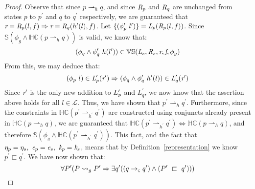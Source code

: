 \begin{proof}
Observe that since $p \rightharpoonup_{h} q$, and since $\emph{R}_{p}$ and $\emph{R}_q$ are unchanged from states $p$ to $p^\prime$ and $q$ to $q^\prime$ respectively, we are guaranteed that $ \emph{r} = \emph{R}_{p}(l,f) \Rightarrow \emph{r} = \emph{R}_q(h^\prime(l),f)$. Let $\{(\phi_{p}^\prime\ l^\prime)\} =  \emph{L}_{p}(\emph{R}_{p}(l,f))$. Since $\mathbb{S}(\phi_g \wedge \mathbb{HC}(p \rightharpoonup_{h} q))$ is valid, we know that:
 $$(\phi_q \wedge \phi_q^\prime\ h(l^\prime)) \in \mathbb{VS}( \emph{L}_{s},\emph{R}_{s},\emph{r},\emph{f},\phi_g)$$ 
From this, we may deduce that:
$$ (\phi_{p}\ l) \in \emph{L}_{p}^\prime(\emph{r}^\prime) \Rightarrow (\phi_q \wedge \phi_q^\prime\ h^\prime(l))\in \emph{L}_q^\prime(\emph{r}^\prime)$$
Since $\emph{r}^\prime$ is the only new addition to $L_{p}^\prime$ and $L_q^\prime$, we now know that the assertion above holds for all $l \in \mathcal{L}$. Thus, we have shown that $p^\prime \rightharpoonup_{h} q^\prime$. Furthermore, since the constraints in $\mathbb{HC}(p^\prime \rightharpoonup_{h^\prime} q^\prime)$ are constructed using conjuncts already present in $ \mathbb{HC}(p \rightharpoonup_{h} q)$, we are guaranteed that $\mathbb{HC}(p^\prime \rightharpoonup_{h^\prime} q^\prime) \Leftrightarrow \mathbb{HC}(p \rightharpoonup_{h} q)$, and therefore $\mathbb{S}(\phi_g \wedge \mathbb{HC}(p^\prime \rightharpoonup_{h^\prime} q^\prime))$. This fact, and the fact that $\eta_{p} = \eta_{s} ,\ \emph{e}_{p} = \emph{e}_{s} ,\ \emph{k}_{p} = \emph{k}_{s}$, means that by Definition~\ref{representation} we know $p^\prime \sqsubset q^\prime$. We have now shown that:
\begin{equation}
\forall P^\prime ( P \leadsto_{g} P^\prime \Rightarrow \exists q^\prime( (q \rightarrow_{\varsigma} q^\prime )\wedge (P^\prime\ \sqsubset\ q^\prime ))  )
\end{equation}


\end{proof}
